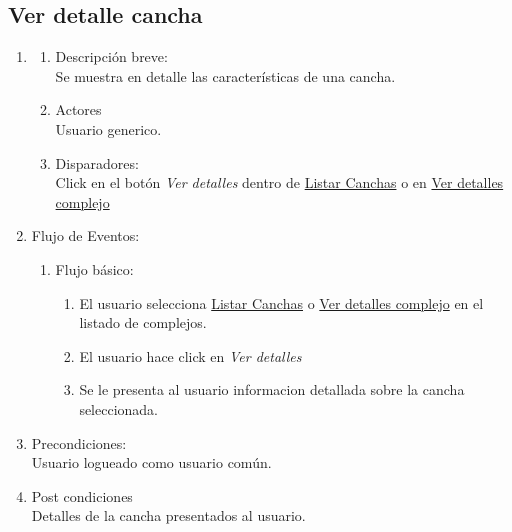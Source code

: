 \documentclass[a4paper,11pt]{article}
\begin{document}
\subsection{Ver detalle cancha}
\begin{enumerate}

    \item
    \begin{enumerate}
    \item Descripción breve: \\
        Se muestra en detalle las características de una cancha.
    \item Actores \\
        Usuario generico.
    \item Disparadores: \\
        Click en el botón \emph{Ver detalles} dentro de \underline{Listar Canchas} o en \underline{Ver detalles complejo}
    \end{enumerate}

    \item Flujo de Eventos: 
    \begin{enumerate}
        \item Flujo básico:
        \begin{enumerate}
            \item El usuario selecciona \underline{Listar Canchas}
                o \underline{Ver detalles complejo} en el listado de complejos.
            \item El usuario hace click en \emph{Ver detalles}
            \item Se le presenta al usuario informacion detallada sobre la cancha seleccionada.
        \end{enumerate}
    \end{enumerate}

    \item Precondiciones: \\
        Usuario logueado como usuario común.
    \item Post condiciones \\
        Detalles de la cancha presentados al usuario.

\end{enumerate}

\end{document}
